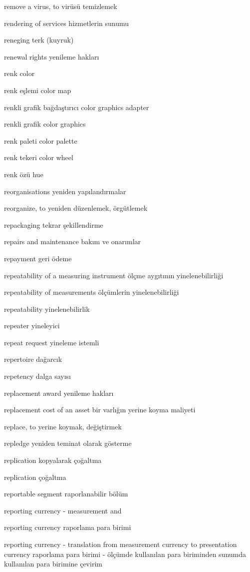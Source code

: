 \documentclass[12pt,fleqn]{article}\usepackage{../../common}
\begin{document}
remove a virus, to virüsü temizlemek

rendering of services hizmetlerin sunumu

reneging terk (kuyruk)

renewal rights yenileme hakları

renk color

renk eşlemi color map

renkli grafik bağdaştırıcı color graphics adapter

renkli grafik color graphics

renk paleti color palette

renk tekeri color wheel

renk özü hue

reorganisations yeniden yapılandırmalar

reorganize, to yeniden düzenlemek, örgütlemek

repackaging tekrar şekillendirme

repairs and maintenance bakım ve onarımlar

repayment geri ödeme

repeatability of a measuring instrument ölçme aygıtının yinelenebilirliği

repeatability of measurements ölçümlerin yinelenebilirliği

repeatability yinelenebilirlik

repeater yineleyici

repeat request yineleme istemli

repertoire dağarcık

repetency dalga sayısı

replacement award yenileme hakları

replacement cost of an asset bir varlığın yerine koyma maliyeti

replace, to yerine koymak, değiştirmek

repledge yeniden teminat olarak gösterme

replication kopyalarak çoğaltma

replication çoğaltma

reportable segment raporlanabilir bölüm

reporting currency - measurement and

reporting currency raporlama para birimi

reporting currency - translation from measurement currency to presentation currency raporlama para birimi - ölçümde kullanılan para biriminden sunumda kullanılan para birimine çevirim
\end{document}
